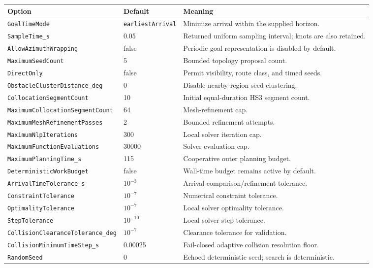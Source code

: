 \documentclass[10pt,letterpaper]{article}
\newcommand{\file}[1]{\nolinkurl{#1}}
\begin{document}
\begin{longtable}{@{}p{.36\linewidth}p{.22\linewidth}p{.34\linewidth}@{}}
\toprule
Option & Default & Meaning \\
\midrule
\endhead
\file{GoalTimeMode} & \file{earliestArrival} & Minimize arrival within the supplied horizon. \\
\file{SampleTime_s} & 0.05 & Returned uniform sampling interval; knots are also retained. \\
\file{AllowAzimuthWrapping} & false & Periodic goal representation is disabled by default. \\
\file{MaximumSeedCount} & 5 & Bounded topology proposal count. \\
\file{DirectOnly} & false & Permit visibility, route class, and timed seeds. \\
\file{ObstacleClusterDistance_deg} & 0 & Disable nearby-region seed clustering. \\
\file{CollocationSegmentCount} & 10 & Initial equal-duration HS3 segment count. \\
\file{MaximumCollocationSegmentCount} & 64 & Mesh-refinement cap. \\
\file{MaximumMeshRefinementPasses} & 2 & Bounded refinement attempts. \\
\file{MaximumNlpIterations} & 300 & Local solver iteration cap. \\
\file{MaximumFunctionEvaluations} & 30000 & Solver evaluation cap. \\
\file{MaximumPlanningTime_s} & 115 & Cooperative outer planning budget. \\
\file{DeterministicWorkBudget} & false & Wall-time budget remains active by default. \\
\file{ArrivalTimeTolerance_s} & $10^{-3}$ & Arrival comparison/refinement tolerance. \\
\file{ConstraintTolerance} & $10^{-7}$ & Numerical constraint tolerance. \\
\file{OptimalityTolerance} & $10^{-7}$ & Local solver optimality tolerance. \\
\file{StepTolerance} & $10^{-10}$ & Local solver step tolerance. \\
\file{CollisionClearanceTolerance_deg} & $10^{-7}$ & Clearance tolerance for validation. \\
\file{CollisionMinimumTimeStep_s} & 0.00025 & Fail-closed adaptive collision resolution floor. \\
\file{RandomSeed} & 0 & Echoed deterministic seed; search is deterministic. \\
\bottomrule
\end{longtable}
\end{document}
